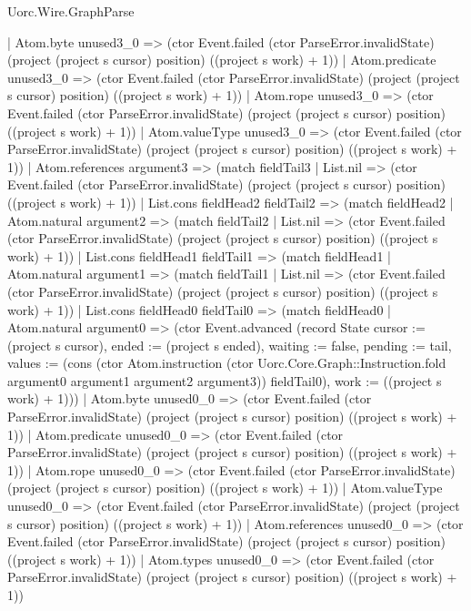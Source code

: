 \begin{lexlean}{Uorc.Wire.GraphParse}
\begin{semanticmodule}
{          | Atom.byte unused3_0 => (ctor Event.failed (ctor ParseError.invalidState) (project (project s cursor) position) ((project s work) + 1))
          | Atom.predicate unused3_0 => (ctor Event.failed (ctor ParseError.invalidState) (project (project s cursor) position) ((project s work) + 1))
          | Atom.rope unused3_0 => (ctor Event.failed (ctor ParseError.invalidState) (project (project s cursor) position) ((project s work) + 1))
          | Atom.valueType unused3_0 => (ctor Event.failed (ctor ParseError.invalidState) (project (project s cursor) position) ((project s work) + 1))
          | Atom.references argument3 => (match fieldTail3
            | List.nil => (ctor Event.failed (ctor ParseError.invalidState) (project (project s cursor) position) ((project s work) + 1))
            | List.cons fieldHead2 fieldTail2 => (match fieldHead2
              | Atom.natural argument2 => (match fieldTail2
                | List.nil => (ctor Event.failed (ctor ParseError.invalidState) (project (project s cursor) position) ((project s work) + 1))
                | List.cons fieldHead1 fieldTail1 => (match fieldHead1
                  | Atom.natural argument1 => (match fieldTail1
                    | List.nil => (ctor Event.failed (ctor ParseError.invalidState) (project (project s cursor) position) ((project s work) + 1))
                    | List.cons fieldHead0 fieldTail0 => (match fieldHead0
                      | Atom.natural argument0 => (ctor Event.advanced (record State {cursor := (project s cursor), ended := (project s ended), waiting := false, pending := tail, values := (cons (ctor Atom.instruction (ctor Uorc.Core.Graph::Instruction.fold argument0 argument1 argument2 argument3)) fieldTail0), work := ((project s work) + 1)}))
                      | Atom.byte unused0_0 => (ctor Event.failed (ctor ParseError.invalidState) (project (project s cursor) position) ((project s work) + 1))
                      | Atom.predicate unused0_0 => (ctor Event.failed (ctor ParseError.invalidState) (project (project s cursor) position) ((project s work) + 1))
                      | Atom.rope unused0_0 => (ctor Event.failed (ctor ParseError.invalidState) (project (project s cursor) position) ((project s work) + 1))
                      | Atom.valueType unused0_0 => (ctor Event.failed (ctor ParseError.invalidState) (project (project s cursor) position) ((project s work) + 1))
                      | Atom.references unused0_0 => (ctor Event.failed (ctor ParseError.invalidState) (project (project s cursor) position) ((project s work) + 1))
                      | Atom.types unused0_0 => (ctor Event.failed (ctor ParseError.invalidState) (project (project s cursor) position) ((project s work) + 1))
}
\end{semanticmodule}
\end{lexlean}
